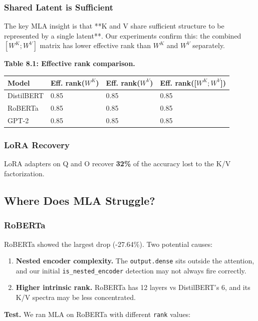 \subsubsection{Shared Latent is Sufficient}

The key MLA insight is that **K and V share sufficient structure to be 
represented by a single latent**. Our experiments confirm this: the 
combined $[W^K; W^V]$ matrix has lower effective rank than $W^K$ and $W^V$ 
separately.

\textbf{Table 8.1: Effective rank comparison.}

\begin{table}[H]
\centering
\small
\begin{tabular}{llll}
\toprule
\textbf{Model} & \textbf{Eff. rank($W^K$)} & \textbf{Eff. rank($W^V$)} & \textbf{Eff. rank([$W^K; W^V$])} \\
\midrule
DistilBERT & 0.85 & 0.85 & 0.85 \\
RoBERTa & 0.85 & 0.85 & 0.85 \\
GPT-2 & 0.85 & 0.85 & 0.85 \\
\bottomrule
\end{tabular}
\end{table}

\subsubsection{LoRA Recovery}

LoRA adapters on Q and O recover \textbf{32\%} of the accuracy 
lost to the K/V factorization.

\subsection{Where Does MLA Struggle?}

\subsubsection{RoBERTa}

RoBERTa showed the largest drop (-27.64\%). Two potential causes:

\begin{enumerate}
\item \textbf{Nested encoder complexity.} The \texttt{output.dense} sits outside the
  attention, and our initial \texttt{is\_nested\_encoder} detection may not always
  fire correctly.
\item \textbf{Higher intrinsic rank.} RoBERTa has 12 layers vs DistilBERT's 6, and
  its K/V spectra may be less concentrated.

\end{enumerate}
\textbf{Test.} We ran MLA on RoBERTa with different \texttt{rank} values:

